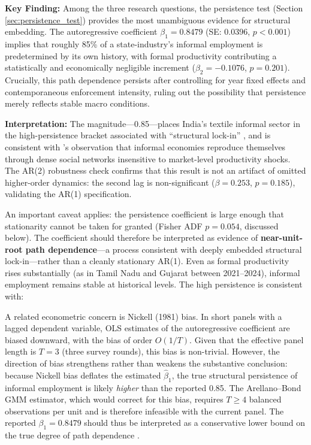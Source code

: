 \noindent \textbf{Key Finding:} Among the three research questions, the persistence test (Section \ref{sec:persistence_test}) provides the most unambiguous evidence for structural embedding. The autoregressive coefficient $\beta_1 = 0.8479$ (SE: 0.0396, $p < 0.001$) implies that roughly 85\% of a state-industry's informal employment is predetermined by its own history, with formal productivity contributing a statistically and economically negligible increment ($\beta_2 = -0.1076$, $p = 0.201$). Crucially, this path dependence persists after controlling for year fixed effects and contemporaneous enforcement intensity, ruling out the possibility that persistence merely reflects stable macro conditions.

\noindent \textbf{Interpretation:} The magnitude—0.85—places India's textile informal sector in the high-persistence bracket associated with ``structural lock-in'' \autocite{Portes1989}, and is consistent with \textcite{Venkatesh2006}'s observation that informal economies reproduce themselves through dense social networks insensitive to market-level productivity shocks. The AR(2) robustness check confirms that this result is not an artifact of omitted higher-order dynamics: the second lag is non-significant ($\beta = 0.253$, $p = 0.185$), validating the AR(1) specification.

An important caveat applies: the persistence coefficient is large enough that stationarity cannot be taken for granted (Fisher ADF $p = 0.054$, discussed below). The coefficient should therefore be interpreted as evidence of \textbf{near-unit-root path dependence}—a process consistent with deeply embedded structural lock-in—rather than a cleanly stationary AR(1). Even as formal productivity rises substantially (as in Tamil Nadu and Gujarat between 2021--2024), informal employment remains stable at historical levels. The high persistence is consistent with:

A related econometric concern is Nickell (1981) bias. In short panels with a lagged dependent variable, OLS estimates of the autoregressive coefficient are biased downward, with the bias of order $O(1/T)$. Given that the effective panel length is $T = 3$ (three survey rounds), this bias is non-trivial. However, the direction of bias strengthens rather than weakens the substantive conclusion: because Nickell bias deflates the estimated $\hat{\beta}_1$, the true structural persistence of informal employment is likely \textit{higher} than the reported 0.85. The Arellano--Bond GMM estimator, which would correct for this bias, requires $T \geq 4$ balanced observations per unit and is therefore infeasible with the current panel. The reported $\beta_1 = 0.8479$ should thus be interpreted as a conservative lower bound on the true degree of path dependence \autocite{Nickell1981}.

